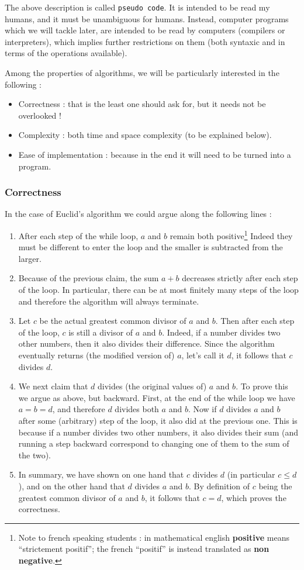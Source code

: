 \documentclass[12pt]{article}
\theoremstyle{plain}
\theoremstyle{remark}
\begin{document}
The above description is called {\tt pseudo code}. It is intended to be read my
humans, and it must be unambiguous for humans. Instead, computer programs which
we will tackle later, are intended to be read by computers (compilers or
interpreters), which implies further restrictions on them (both syntaxic and
in terms of the operations available). 

Among the properties of algorithms, we will be particularly interested in the
following :
\begin{itemize}
\item Correctness : that is the least one should ask for, but it needs not be overlooked !
\item Complexity : both time and space complexity (to be explained below).
\item Ease of implementation : because in the end it will need to be turned
into a program.
\end{itemize}

\subsubsection*{Correctness}
In the case of Euclid's algorithm we could argue along
the following lines :
\begin{enumerate}
\item After each step of the while loop, $a$ and $b$ remain both
	positive\footnote{Note to french speaking students : in mathematical english
		{\bf positive} means ``strictement positif''; the french ``positif''
		is instead translated as {\bf non negative}.}
Indeed they must be different to enter the loop and the smaller is subtracted
from the larger. 
\item Because of the previous claim, the sum $a + b$ decreases strictly after
each step of the loop. In particular, there can be at most finitely many steps
of the loop and therefore the algorithm will always terminate.
\item Let $c$ be the actual greatest common divisor of $a$ and $b$. Then after
each step of the loop, $c$ is still a divisor of $a$ and $b$. Indeed, if a
number divides two other numbers, then it also divides their difference. Since
the algorithm eventually returns (the modified version of) $a$, let's call it
$d$, it follows that $c$ divides $d$.
\item We next claim that $d$ divides (the original values of) $a$ and $b$. To
prove this we argue as above, but backward. First, at the end of the while loop
we have $a = b = d$, and therefore $d$ divides both $a$ and $b$. Now if $d$
divides $a$ and $b$ after some (arbitrary) step of the loop, it also did at the
previous one. This is because if a number divides two other numbers, it also
divides their sum (and running a step backward correspond to changing one of
them to the sum of the two). 
\item In summary, we have shown on one hand that $c$ divides $d$ (in particular
$c \leq d$), and on the other hand that $d$ divides $a$
and $b$. By definition of $c$ being the greatest common divisor of $a$ and $b$,
it follows that $c = d$, which proves the correctness.
\end{enumerate} 
\end{document}
